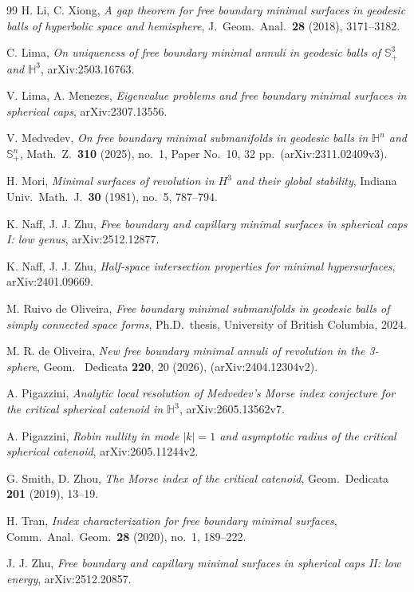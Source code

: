 \documentclass[10pt,a4paper]{amsart}
\newcommand{\Sph}{\mathbb{S}}
\newcommand{\Hyp}{\mathbb{H}}
\begin{document}
\begin{thebibliography}{99}
 H. Li, C. Xiong, \emph{A gap theorem for free boundary minimal surfaces in geodesic balls of hyperbolic space and hemisphere}, J.\ Geom.\ Anal.\ \textbf{28} (2018), 3171--3182.

 C. Lima, \emph{On uniqueness of free boundary minimal annuli in geodesic balls of $\Sph^3_+$ and $\Hyp^3$}, arXiv:2503.16763.

 V. Lima, A. Menezes, \emph{Eigenvalue problems and free boundary minimal surfaces in spherical caps}, arXiv:2307.13556.

 V. Medvedev, \emph{On free boundary minimal submanifolds in geodesic balls in $\Hyp^n$ and $\Sph^n_+$}, Math.\ Z.\ \textbf{310} (2025), no.\ 1, Paper No.\ 10, 32 pp.\ (arXiv:2311.02409v3).

 H. Mori, \emph{Minimal surfaces of revolution in $H^3$ and their global stability}, Indiana Univ.\ Math.\ J.\ \textbf{30} (1981), no.\ 5, 787--794.

 K. Naff, J. J. Zhu, \emph{Free boundary and capillary minimal surfaces in spherical caps I: low genus}, arXiv:2512.12877.

 K. Naff, J. J. Zhu, \emph{Half-space intersection properties for minimal hypersurfaces}, arXiv:2401.09669.

 M. Ruivo de Oliveira, \emph{Free boundary minimal submanifolds in geodesic balls of simply connected space forms}, Ph.D.\ thesis, University of British Columbia, 2024.

 M. R. de Oliveira, \emph{New free boundary minimal annuli of revolution in the 3-sphere}, Geom. \ Dedicata \textbf{220}, 20 (2026), (arXiv:2404.12304v2).

 A. Pigazzini, \emph{Analytic local resolution of Medvedev's Morse index conjecture for the critical spherical catenoid in $\Hyp^3$}, arXiv:2605.13562v7.

 A. Pigazzini, \emph{Robin nullity in mode $|k|=1$ and asymptotic radius of the critical spherical catenoid}, arXiv:2605.11244v2.

 G. Smith, D. Zhou, \emph{The Morse index of the critical catenoid}, Geom.\ Dedicata \textbf{201} (2019), 13--19.

 H. Tran, \emph{Index characterization for free boundary minimal surfaces}, Comm.\ Anal.\ Geom.\ \textbf{28} (2020), no.\ 1, 189--222.

 J. J. Zhu, \emph{Free boundary and capillary minimal surfaces in spherical caps II: low energy}, arXiv:2512.20857.

\end{thebibliography}
\end{document}
